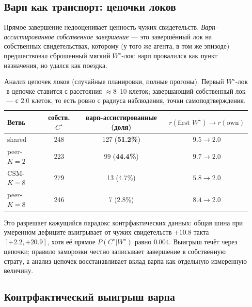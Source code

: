 \documentclass{article}
\newcommand{\wstar}{W^{\star}}
\newcommand{\cstar}{C^{\star}}
\begin{document}
\subsection{Варп как транспорт: цепочки локов}
\label{p2:sec:taxi}

Прямое завершение недооценивает ценность чужих свидетельств.
\emph{Варп-ассистированное собственное завершение} --- это
завершённый лок на собственных свидетельствах, которому (у того же
агента, в том же эпизоде) предшествовал сброшенный мягкий
$\wstar$-лок: варп провалился как пункт назначения, но удался как
поездка.

\begin{table}[h]
\centering
\caption{Анализ цепочек локов (случайные планировки, полные прогоны).
Первый $\wstar$-лок в цепочке ставится с расстояния
${\approx}8$--$10$ клеток; завершающий собственный лок --- с $2.0$
клеток, то есть ровно с радиуса наблюдения, точки
самоподтверждения.}
\label{p2:tab:taxi}
\small
\begin{tabular}{lccc}
\toprule
Ветвь & собств. $\cstar$ & варп-ассистированные (доля) & $r(\text{first }\wstar) \to r(\text{own})$ \\
\midrule
shared          & 248 & 127 (\textbf{51.2\%}) & $9.5 \to 2.0$ \\
peer-$K{=}2$    & 223 & 99 (\textbf{44.4\%})  & $9.7 \to 2.0$ \\
CSM-$K{=}8$     & 279 & 13 (4.7\%)            & $5.8 \to 2.0$ \\
peer-$K{=}8$    & 246 & 7 (2.8\%)             & $8.4 \to 2.0$ \\
\bottomrule
\end{tabular}
\end{table}

Это разрешает кажущийся парадокс контрфактических данных: общая шина
при умеренном дефиците выигрывает от чужих свидетельств $+10.8$ такта
$[+2.2,+20.9]$, хотя её прямое $P(\cstar|\wstar)$ равно $0.004$.
Выигрыш течёт через цепочки; правило заморозки честно записывает
завершение в собственную страту, а анализ цепочек восстанавливает
вклад варпа как отдельную измеренную величину.

\subsection{Контрфактический выигрыш варпа}
\label{p2:sec:gain}
\end{document}
